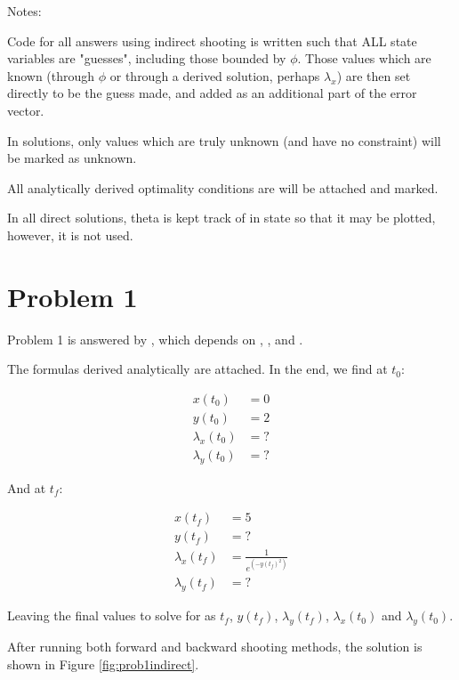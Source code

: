 \documentclass[12pt,letterpaper]{article}
\begin{document}
Notes: 

Code for all answers using indirect shooting is written such that ALL state variables are "guesses", including those bounded by $\phi$. Those values which are known (through $\phi$ or through a derived solution, perhaps $\lambda_x$) are then set directly to be the guess made, and added as an additional part of the error vector.

In solutions, only values which are truly unknown (and have no constraint) will be marked as unknown. 

All analytically derived optimality conditions are will be attached and marked.

In all direct solutions, theta is kept track of in state so that it may be plotted, however, it is not used. 

\section*{Problem 1}

Problem 1 is answered by , which depends on , , and . 

The formulas derived analytically are attached. In the end, we find at $t_0$:

\begin{equation}
\begin{aligned}
\label{eq:2}
x(t_0) &= 0 \\
y(t_0) &= 2 \\
\lambda_x(t_0) &= ? \\
\lambda_y(t_0) &= ? 
\end{aligned}
\end{equation}

And at $t_f$:

\begin{equation}
\begin{aligned}
\label{eq:2}
x(t_f) &= 5 \\
y(t_f) &= ? \\
\lambda_x(t_f) &= \frac{1}{e^(-y(t_f)^2)} \\
\lambda_y(t_f) &= ? 
\end{aligned}
\end{equation}

Leaving the final values to solve for as $t_f$, $y(t_f)$, $\lambda_y(t_f)$, $\lambda_x(t_0)$ and $\lambda_y(t_0)$.

After running both forward and backward shooting methods, the solution is shown in Figure \ref{fig:prob1indirect}.
\end{document}

